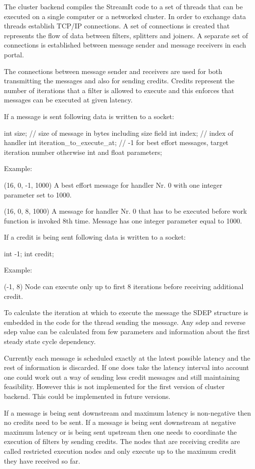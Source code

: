 
The cluster backend compiles the StreamIt code to a set of threads that can be executed on a single computer or a networked cluster. In order to exchange data threads establish TCP/IP connections. A set of connections is created that represents the flow of data between filters, splitters and joiners. A separate set of connections is established between message sender and message receivers in each portal.

The connections between message sender and receivers are used for both transmitting the messages and also for sending credits. Credits represent the number of iterations that a filter is allowed to execute and this enforces that messages can be executed at given latency.

If a message is sent following data is written to a socket:

int size; // size of message in bytes including size field
int index; // index of handler
int iteration_to_execute_at; // -1 for best effort messages, target iteration number otherwise
int and float parameters;

Example:

(16, 0, -1, 1000)
A best effort message for handler Nr. 0 with one integer parameter set to 1000. 

(16, 0, 8, 1000)
A message for handler Nr. 0 that has to be executed before work function is invoked 8th time. Message has one integer parameter equal to 1000.

If a credit is being sent following data is written to a socket:

int -1; int credit; 

Example:

(-1, 8) Node can execute only up to first 8 iterations before receiving additional credit.

To calculate the iteration at which to execute the message the SDEP structure is embedded in the code for the thread sending the message. Any sdep and reverse sdep value can be calculated from few parameters and information about the first steady state cycle dependency.

Currently each message is scheduled exactly at the latest possible latency and the rest of information is discarded. If one does take the latency interval into account one could work out a way of sending less credit messages and still maintaining feasibility. However this is not implemented for the first version of cluster backend. This could be implemented in future versions.

If a message is being sent downstream and maximum latency is non-negative then no credits need to be sent. If a message is being sent downstream at negative maximum latency or is being sent upstream then one needs to coordinate the execution of filters by sending credits. The nodes that are receiving credits are called restricted execution nodes and only execute up to the maximum credit they have received so far.

